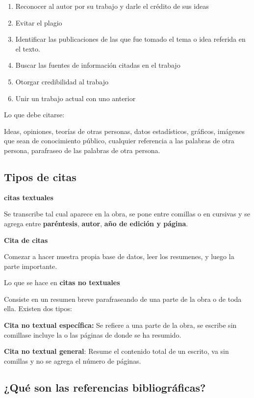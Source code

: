 \documentclass{article}
\begin{document}
\begin{enumerate}
\item Reconocer al autor por su trabajo y darle el crédito de sus ideas\\
\item Evitar el plagio\\
\item Identificar las publicaciones de las que fue tomado el tema o idea referida en el texto.\\
\item Buscar las fuentes de información citadas en el trabajo\\
\item Otorgar credibilidad al trabajo\\
\item Unir un trabajo actual con uno anterior
\end{enumerate}
 
 
 Lo que debe citarse:
 
Ideas, opiniones, teorías de otras personas, datos estadísticos, gráficos, imágenes que sean de conocimiento público, cualquier referencia a las palabras de otra persona, parafraseo de las palabras de otra persona.
 
 
 \subsection{Tipos de citas}
 
 \textbf{citas textuales}
 
 Se transcribe tal cual aparece en la obra, se pone entre comillas o en cursivas y se agrega entre \textbf{paréntesis}, \textbf{autor}, \textbf{año de edición y página}.
 
 \textbf{Cita de citas}
 
 Comezar a hacer nuestra propia base de datos, leer los resumenes, y luego la parte importante.
 
 Lo que se hace en \textbf{citas no textuales}
 
 Consiste en un resumen breve parafraseando de una parte de la obra o de toda ella. Existen dos tipos:
 
 \textbf{Cita no textual específica:} Se refiere a una parte de la obra, se escribe sin comillase incluye la o las páginas de donde se ha resumido.
 
 \textbf{Cita no textual general}: Resume el contenido total de un escrito, va sin comillas y no se agrega el número de páginas.
 
  
\subsection{¿Qué son las referencias bibliográficas?}
\end{document}
